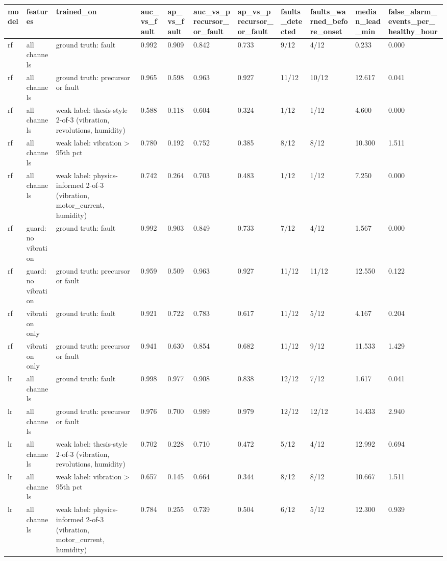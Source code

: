 \begin{tabular}{lllllllllll}
\toprule
model & features & trained\_on & auc\_vs\_fault & ap\_vs\_fault & auc\_vs\_precursor\_or\_fault & ap\_vs\_precursor\_or\_fault & faults\_detected & faults\_warned\_before\_onset & median\_lead\_min & false\_alarm\_events\_per\_healthy\_hour \\
\midrule
rf & all channels & ground truth: fault & 0.992 & 0.909 & 0.842 & 0.733 & 9/12 & 4/12 & 0.233 & 0.000 \\
rf & all channels & ground truth: precursor or fault & 0.965 & 0.598 & 0.963 & 0.927 & 11/12 & 10/12 & 12.617 & 0.041 \\
rf & all channels & weak label: thesis-style 2-of-3 (vibration, revolutions, humidity) & 0.588 & 0.118 & 0.604 & 0.324 & 1/12 & 1/12 & 4.600 & 0.000 \\
rf & all channels & weak label: vibration > 95th pct & 0.780 & 0.192 & 0.752 & 0.385 & 8/12 & 8/12 & 10.300 & 1.511 \\
rf & all channels & weak label: physics-informed 2-of-3 (vibration, motor\_current, humidity) & 0.742 & 0.264 & 0.703 & 0.483 & 1/12 & 1/12 & 7.250 & 0.000 \\
rf & guard: no vibration & ground truth: fault & 0.992 & 0.903 & 0.849 & 0.733 & 7/12 & 4/12 & 1.567 & 0.000 \\
rf & guard: no vibration & ground truth: precursor or fault & 0.959 & 0.509 & 0.963 & 0.927 & 11/12 & 11/12 & 12.550 & 0.122 \\
rf & vibration only & ground truth: fault & 0.921 & 0.722 & 0.783 & 0.617 & 11/12 & 5/12 & 4.167 & 0.204 \\
rf & vibration only & ground truth: precursor or fault & 0.941 & 0.630 & 0.854 & 0.682 & 11/12 & 9/12 & 11.533 & 1.429 \\
lr & all channels & ground truth: fault & 0.998 & 0.977 & 0.908 & 0.838 & 12/12 & 7/12 & 1.617 & 0.041 \\
lr & all channels & ground truth: precursor or fault & 0.976 & 0.700 & 0.989 & 0.979 & 12/12 & 12/12 & 14.433 & 2.940 \\
lr & all channels & weak label: thesis-style 2-of-3 (vibration, revolutions, humidity) & 0.702 & 0.228 & 0.710 & 0.472 & 5/12 & 4/12 & 12.992 & 0.694 \\
lr & all channels & weak label: vibration > 95th pct & 0.657 & 0.145 & 0.664 & 0.344 & 8/12 & 8/12 & 10.667 & 1.511 \\
lr & all channels & weak label: physics-informed 2-of-3 (vibration, motor\_current, humidity) & 0.784 & 0.255 & 0.739 & 0.504 & 6/12 & 5/12 & 12.300 & 0.939 \\

\end{tabular}
